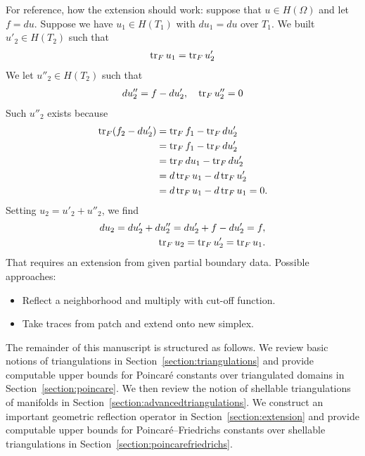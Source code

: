 \documentclass[a4paper]{article}
\begin{document}
\begin{remark}
 For reference, how the extension should work:
 suppose that $u \in H(\Omega)$ and let $f = du$.
 Suppose we have $u_1 \in H(T_1)$ with $du_1 = du$ over $T_1$. 
 We built $u'_2 \in H(T_2)$ such that 
 \begin{align*}
    \operatorname{tr}_F u_1 = \operatorname{tr}_F u'_2
 \end{align*}
 We let $u''_2 \in H(T_2)$ such that 
 \begin{align*}
    d u''_2 = f - d u'_2, \quad \operatorname{tr}_F u''_2 = 0
 \end{align*}
 Such $u''_2$ exists because 
 \begin{align*}
  \operatorname{tr}_F( f_2 - d u'_2 ) 
  &= 
  \operatorname{tr}_F f_1 - \operatorname{tr}_F d u'_2
  \\&= 
  \operatorname{tr}_F f_1 - \operatorname{tr}_F d u'_2
  \\&= 
  \operatorname{tr}_F d u_1 - \operatorname{tr}_F d u'_2
  \\&= 
  d \operatorname{tr}_F u_1 - d \operatorname{tr}_F u'_2
  \\&= 
  d \operatorname{tr}_F u_1 - d \operatorname{tr}_F u_1
  = 0
  .
 \end{align*}
 Setting $u_2 = u'_2 + u''_2$, we find 
 \begin{align*}
    d u_2 = d u'_2 + d u''_2 = d u'_2 + f - d u'_2 = f,
    \\
    \operatorname{tr}_F u_2 = \operatorname{tr}_F u'_2 = \operatorname{tr}_F u_1.
 \end{align*}
 That requires an extension from given partial boundary data. 
 Possible approaches:
 \begin{itemize}
  \item Reflect a neighborhood and multiply with cut-off function.
  \item Take traces from patch and extend onto new simplex. 
 \end{itemize}

\end{remark}

The remainder of this manuscript is structured as follows.
We review basic notions of triangulations in Section~\ref{section:triangulations} and provide computable upper bounds for Poincar\'e constants over triangulated domains in Section~\ref{section:poincare}.
We then review the notion of shellable triangulations of manifolds in Section~\ref{section:advancedtriangulations}.
We construct an important geometric reflection operator in Section~\ref{section:extension}
and provide computable upper bounds for Poincar\'e--Friedrichs constants over shellable triangulations in Section~\ref{section:poincarefriedrichs}.
\end{document}
